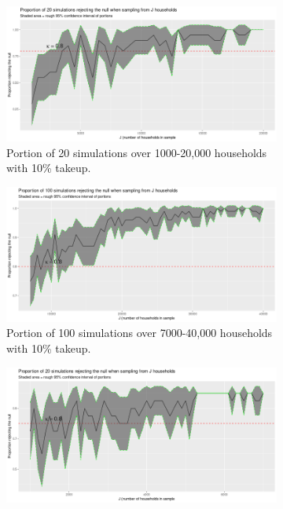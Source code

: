 \documentclass[12pt]{article}
\begin{document}
\def\widthfrac{0.45}
\begin{figure}[h!]
\centering
\begin{subfigure}{\widthfrac\textwidth}
    \centering
    \includegraphics[width=\textwidth]{"1-2_simulations_20_1000-to-20000_takeup-0.1"}
    \caption{Portion of 20 simulations over 1000-20,000 households with 10\% takeup.}
    \label{fig1-3a}
  \end{subfigure}
\begin{subfigure}{\widthfrac\textwidth}
    \centering
    \includegraphics[width=\textwidth]{"1-2_simulations_100_7000-to-40000_takeup-0.1"}
    \caption{Portion of 100 simulations over 7000-40,000 households with 10\% takeup.}
    \label{fig1-3b}
  \end{subfigure}
\begin{subfigure}{\widthfrac\textwidth}
    \centering
    \includegraphics[width=\textwidth]{"1-2_simulations_20_1000-to-7000_takeup-0.5"}

\end{subfigure}
\end{figure}
\end{document}
